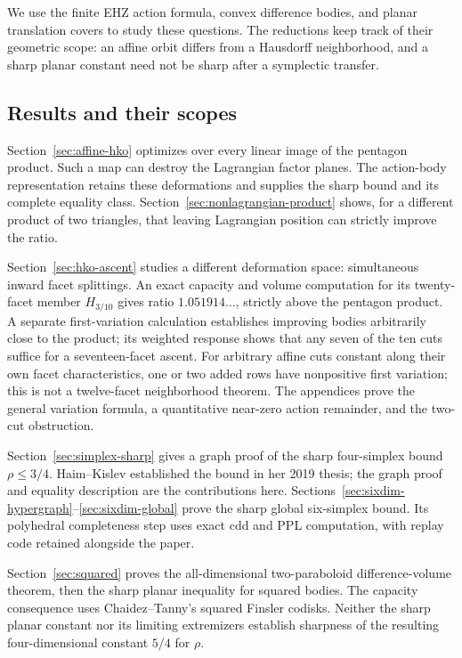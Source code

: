 \documentclass[a4paper,11pt]{article}
\theoremstyle{definition}
\theoremstyle{remark}
\begin{document}
We use the finite EHZ action formula, convex difference bodies, and planar
translation covers to study these questions. The reductions keep track of
their geometric scope: an affine orbit differs from a Hausdorff neighborhood,
and a sharp planar constant need not be sharp after a symplectic transfer.

\subsection{Results and their scopes}

Section~\ref{sec:affine-hko} optimizes over every linear image of the
pentagon product. Such a map can destroy the Lagrangian factor planes. The
action-body representation retains these deformations and supplies the sharp
bound and its complete equality class. Section~\ref{sec:nonlagrangian-product}
shows, for a different product of two triangles, that leaving Lagrangian
position can strictly improve the ratio.

Section~\ref{sec:hko-ascent} studies a different deformation space:
simultaneous inward facet splittings. An exact capacity and volume
computation for its twenty-facet member $H_{3/10}$ gives ratio
$1.051914\ldots$, strictly above the pentagon product. A separate
first-variation calculation establishes improving bodies arbitrarily close
to the product; its weighted response shows that any seven of the ten cuts
suffice for a seventeen-facet ascent. For arbitrary affine cuts constant
along their own facet characteristics, one or two added rows have
nonpositive first variation; this is not a twelve-facet neighborhood theorem.
The appendices prove the general variation formula, a quantitative
near-zero action remainder, and the two-cut obstruction.

Section~\ref{sec:simplex-sharp} gives a graph proof of the sharp
four-simplex bound $\rho\leq3/4$. Haim--Kislev established the bound in her
2019 thesis; the graph proof and equality description are the contributions
here. Sections~\ref{sec:sixdim-hypergraph}--\ref{sec:sixdim-global} prove the
sharp global six-simplex bound. Its polyhedral completeness step uses exact
cdd and PPL computation, with replay code retained alongside the paper.

Section~\ref{sec:squared} proves the all-dimensional two-paraboloid
difference-volume theorem, then the sharp planar inequality for squared
bodies. The capacity consequence uses Chaidez--Tanny's squared Finsler
codisks. Neither the sharp planar constant nor its limiting extremizers
establish sharpness of the resulting four-dimensional constant $5/4$ for
$\rho$.
\end{document}
